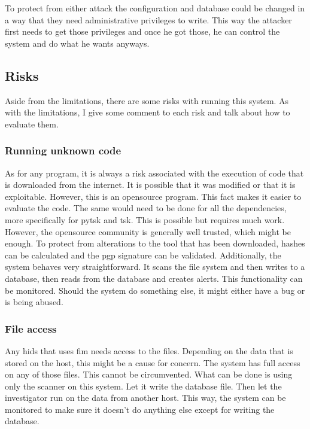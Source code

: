 To protect from either attack the configuration and database could be changed in a way that they need administrative privileges to write. This way the attacker first needs to get those privileges and once he got those, he can control the system and do what he wants anyways.

\subsection{Risks}
\label{sec:risk}

Aside from the limitations, there are some risks with running this system. As with the limitations, I give some comment to each risk and talk about how to evaluate them.

\subsubsection{Running unknown code}
\label{sec:risk:unknowncode}

As for any program, it is always a risk associated with the execution of code that is downloaded from the internet. It is possible that it was modified or that it is exploitable. However, this is an \gls{opensource} program. This fact makes it easier to evaluate the code. The same would need to be done for all the dependencies, more specifically for \gls{pytsk} and \gls{tsk}. This is possible but requires much work. However, the \gls{opensource} community is generally well trusted, which might be enough. To protect from alterations to the tool that has been downloaded, hashes can be calculated and the \gls{pgp} signature can be validated.
Additionally, the system behaves very straightforward. It scans the file system and then writes to a database, then reads from the database and creates alerts. This functionality can be monitored. Should the system do something else, it might either have a bug or is being abused.

\subsubsection{File access}
\label{sec:risk:file}

Any \gls{hids} that uses \gls{fim} needs access to the files. Depending on the data that is stored on the host, this might be a cause for concern. The system has full access on any of those files. This cannot be circumvented. What can be done is using only the scanner on this system. Let it write the database file. Then let the investigator run on the data from another host. This way, the system can be monitored to make sure it doesn't do anything else except for writing the database.

